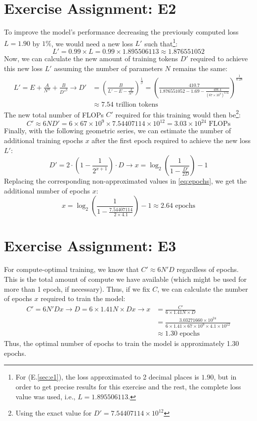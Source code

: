 \documentclass{article}
\begin{document}
\section{Exercise Assignment: E2}\label{sec:e2}
To improve the model's performance decreasing the previously computed loss $L = 1.90$ by $1\%$, we would need a new loss $L'$ such that\footnote{For (E.\ref{sec:e1}), the loss approximated to 2 decimal places is $1.90$, but in order to get precise results for this exercise and the rest, the complete loss value was used, i.e., $L = 1.895506113$.}:
\[
    L' = 0.99 \times L = 0.99 \times 1.895506113 \approx 1.876551052
\]
Now, we can calculate the new amount of training tokens $D'$ required to achieve this new loss $L'$ assuming the number of parameters $N$ remains the same:
\begin{align*}
    L' = E + \frac{A}{N^\alpha} + \frac{B}{D'^\beta} \rightarrow D' & = \left(\frac{B}{L' - E - \frac{A}{N^\alpha}}\right)^{\frac{1}{\beta}} = \left(\frac{410.7}{1.876551052 - 1.69 - \frac{406.4}{(67 \times 10^9)^{0.34}}}\right)^{\frac{1}{0.28}} \\
                                                                    & \approx 7.54 \text{ trillion tokens}
\end{align*}
The new total number of FLOPs $C'$ required for this training would then be\footnote{Using the exact value for $D'=7.54407114 \times 10^{12}$}:
\[
    C' \approx 6ND' = 6 \times 67 \times 10^9 \times 7.54407114 \times 10^{12} = 3.03 \times 10^{24} \text{ FLOPs}
\]
Finally, with the following geometric series, we can estimate the number of additional training epochs $x$ after the first epoch required to achieve the new loss $L'$:
\begin{equation}\label{eq:epochs}
    D' = 2 \cdot \left(1 - \frac{1}{2^{x+1}}\right) \cdot D \rightarrow x = \log_2\left(\frac{1}{1 - \frac{D'}{2D}}\right) - 1
\end{equation}
Replacing the corresponding non-approximated values in \eqref{eq:epochs}, we get the additional number of epochs $x$:
\[
    x = \log_2\left(\frac{1}{1 - \frac{7.54407114}{2 \times 4.1}}\right) - 1 \approx 2.64 \text{ epochs}
\]

\section{Exercise Assignment: E3}\label{sec:e3}
For compute-optimal training, we know that $C' \approx 6N'D$ regardless of epochs. This is the total amount of compute we have available (which might be used for more than 1 epoch, if necessary). Thus, if we fix $C$, we can calculate the number of epochs $x$ required to train the model:
\begin{align*}
    C' = 6N'Dx \rightarrow D = 6 \times 1.41N \times Dx \rightarrow x & = \frac{C'}{6 \times 1.41N \times D} \\ & = \frac{3.03271660 \times 10^{24}}{6 \times 1.41 \times 67 \times 10^9 \times 4.1 \times 10^{12}} \\ &\approx 1.30 \text{ epochs}
\end{align*}
Thus, the optimal number of epochs to train the model is approximately 1.30 epochs.
\end{document}
